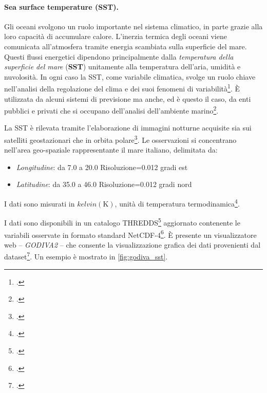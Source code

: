 \documentclass[./main.tex]{subfiles}
\begin{document}
\paragraph{Sea surface temperature (SST).} 
Gli oceani svolgono un ruolo importante nel sistema climatico, in parte grazie alla loro capacità di accumulare calore. L'inerzia termica degli oceani viene comunicata all'atmosfera tramite energia scambiata sulla superficie del mare. Questi flussi energetici dipendono principalmente dalla \textit{temperatura della superficie del mare} (\textbf{SST}) unitamente alla temperatura dell'aria, umidità e nuvolosità. In ogni caso la SST, come variabile climatica, svolge un ruolo chiave nell'analisi della regolazione del clima e dei suoi fenomeni di variabilità\footcite[116]{DeserSST2010}. È utilizzata da alcuni sistemi di previsione ma anche, ed è questo il caso, da enti pubblici e privati che si occupano  dell'analisi dell'ambiente marino\footcite[334]{BUONGIORNONARDELLI2015334}. 

La SST è rilevata tramite l'elaborazione di immagini notturne acquisite sia sui satelliti geostazionari che in orbita polare\footcite[335]{BUONGIORNONARDELLI2015334}. Le osservazioni si concentrano nell'area geo-spaziale rappresentante il mare italiano, delimitata da:
\begin{itemize}
    \item \textit{Longitudine}: da 7.0 a 20.0 Risoluzione=0.012 gradi est
    \item \textit{Latitudine}: da 35.0 a 46.0 Risoluzione=0.012 gradi nord 
\end{itemize}

I dati sono misurati in $kelvin (\unit\kelvin)$, unità di temperatura termodinamica\footcite[87]{10.1039/9781847557889}. 

I dati sono disponibili in un catalogo THREDDS\footcite[\url{http://ritmare.artov.ismar.cnr.it/thredds/ritmare/SatelliteOS/SST/catalog.html?dataset=SSTUHR}]{thredds-sst}  aggiornato contenente le variabili osservate in formato standard NetCDF-4\footcite[19-47]{HFR_QC_JERICO}. È presente un visualizzatore web -- \textit{GODIVA2} -- che consente la visualizzazione grafica dei dati provenienti dal dataset\footcite{blower2009godiva2}. Un esempio è mostrato in \autoref{fig:godiva_sst}.
\end{document}
